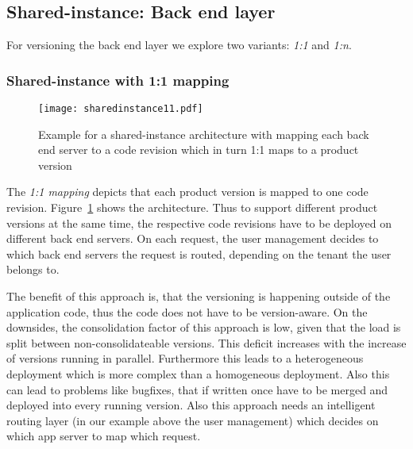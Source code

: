 \subsection{Shared-instance: Back end layer}
\label{sec:backend}

For versioning the back end layer we explore two variants: \emph{1:1} and \emph{1:n}.

\subsubsection{Shared-instance with 1:1 mapping}
\label{sec:backend11}

\begin{figure}[h!]
\centering
\texttt{[image: sharedinstance11.pdf]}
\caption{Example for a shared-instance architecture with mapping each back end server to a code revision which in turn 1:1 maps to a product version}
\label{fig:sharedinstance11}
\vspace{-20pt}
\end{figure}

The \emph{1:1 mapping} depicts that each product version is mapped to one code revision. Figure~\ref{fig:sharedinstance11} shows the architecture. Thus to support different product versions at the same time, the respective code revisions have to be deployed on different back end servers. On each request, the user management decides to which back end servers the request is routed, depending on the tenant the user belongs to.

The benefit of this approach is, that the versioning is happening outside of the application code, thus the code does not have to be version-aware. On the downsides, the consolidation factor of this approach is low, given that the load is split between non-consolidateable versions. This deficit increases with the increase of versions running in parallel. Furthermore this leads to a heterogeneous deployment which is more complex than a homogeneous deployment.  Also this can lead to problems like bugfixes, that if written once have to be merged and deployed into every running version. Also this approach needs an intelligent routing layer (in our example above the user management) which decides on which app server to map which request.

%
%

